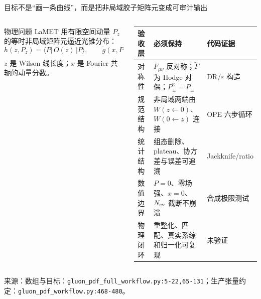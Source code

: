 \documentclass[UTF8,aspectratio=169,11pt]{ctexbeamer}
\newcommand{\source}[1]{%
  \vspace{0.06em}\par{\raggedright\scriptsize\color{muted}来源：#1\par}}
\newcommand{\unverified}{\textcolor{warning}{未验证}}
\newcommand{\codepath}[1]{\nolinkurl{#1}}
\begin{document}
\begin{frame}[t]{目标不是“画一条曲线”，而是把非局域胶子矩阵元变成可审计输出}
  \begin{columns}[T,totalwidth=\textwidth]
    \begin{column}{0.48\textwidth}
      \begin{block}{物理问题}
        \footnotesize
        LaMET 用有限空间动量 \(P_z\) 的等时非局域矩阵元逼近光锥分布：
        \[
          h(z,P_z)=\langle P|\,O(z)\,|P\rangle,
          \qquad \tilde g(x,P_z)\ \xrightarrow[P_z\to\infty]{}\ g(x,\mu).
        \]
        \(z\) 是 Wilson 线长度；\(x\) 是 Fourier 共轭的动量分数。
      \end{block}
    \end{column}
    \begin{column}{0.48\textwidth}
      \scriptsize
      \begin{tabularx}{\linewidth}{@{}lYY@{}}
        \toprule
        验收层 & 必须保持 & 代码证据 \\
        \midrule
        对称性 & \(F_{\mu\nu}\) 反对称；\(\widetilde F\) 为 Hodge 对偶；\(P_\pm^2=P_\pm\) & DR/\(\varepsilon\) 构造 \\
        规范结构 & 非局域两端由 \(W(z\leftarrow0)\)、\(W(0\leftarrow z)\) 连接 & OPE 六步循环 \\
        统计结构 & 组态删除、plateau、协方差与误差可追溯 & Jackknife/ratio \\
        数值边界 & \(P=0\)、零场强、\(x=0\)、\(N_{\rm ev}\) 截断不崩溃 & 合成极限测试 \\
        物理闭环 & 重整化、匹配、真实系综和归一化可复现 & \unverified \\
        \bottomrule
      \end{tabularx}
    \end{column}
  \end{columns}
  \source{数组与目标：\codepath{gluon_pdf_full_workflow.py:5-22,65-131}；生产张量约定：\codepath{gluon_pdf_workflow.py:468-480}。}
\end{frame}
\end{document}
